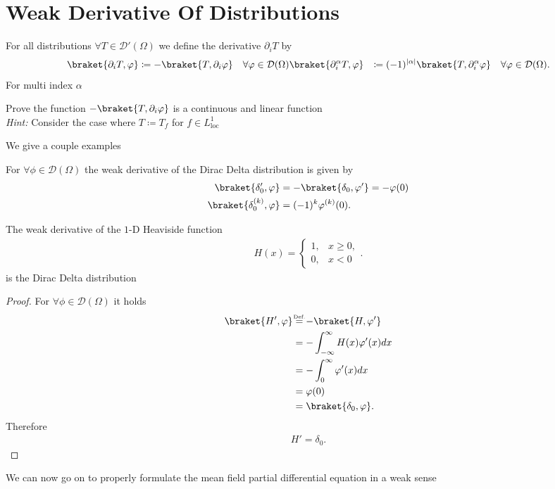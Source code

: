 \section{Weak Derivative Of Distributions}
\begin{definition}
 For all distributions  $\forall  T \in  \mathcal{D}'(\Omega )$  we define the derivative $\partial_i T$ by 
 \begin{align*}
   \braket{\partial_i T,\phi } &\coloneqq -\braket{T,\partial_i \phi } \quad \forall \phi  \in \mathcal{D}(\Omega)
   \braket{\partial_i^{\alpha }  T,\phi } &\coloneqq (-1)^{\abs{\alpha }} \braket{T,\partial_i^{\alpha }  \phi } \quad \forall \phi  \in \mathcal{D}(\Omega)
 .\end{align*}
 For multi index $\alpha $ 
\end{definition}
\begin{exercise}
  Prove the function $-\braket{T,\partial_i \phi }$  is a continuous and linear function  \\[1ex]
  \textit{Hint:} Consider the case where $T \coloneqq T_f$ for $f \in  L_{\text{loc}}^{1} $
\end{exercise}
We give a couple examples 
\newpage
\begin{example}
 For  $\forall \phi  \in  \mathcal{D}(\Omega )$ the weak derivative of the Dirac Delta distribution is given by 
 \begin{align*}
   \braket{\delta'_0,\phi } &= - \braket{\delta_0,\phi'} = -\phi(0)\\
   \braket{\delta_0^{(k)},\phi  } &= (-1)^{k} \phi ^{(k)}  (0)
 .\end{align*}
\end{example}
\begin{lemma}
 The weak derivative of the $1$-D Heaviside function 
 \begin{align*}
  H(x) = \begin{cases}
    1, &x\ge 0,\\
    0,&x<0
  \end{cases}
 .\end{align*}
 is the Dirac Delta distribution
\end{lemma}
\begin{proof}
 For $\forall  \phi  \in \mathcal{D}(\Omega )$  it holds 
 \begin{align*}
   \braket{H',\phi } &\myS{Def.}{=} -\braket{H,\phi'}\\
                     &= - \int_{-\infty}^{\infty} H(x)\phi'(x)  dx \\
                     &= - \int_0^{\infty} \phi'(x) dx \\
                     &= \phi(0) \\
                     &= \braket{\delta_0,\phi }
 .\end{align*}
 Therefore 
 \begin{align*}
  H' = \delta_0
 .\end{align*}
\end{proof}
We can now go on to properly formulate the mean field partial differential equation in a weak sense
